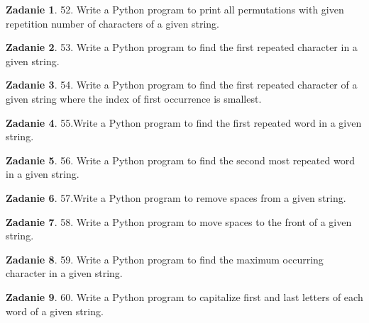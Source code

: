 \documentclass[11pt]{article}
\theoremstyle{definition}
\newtheorem{zadanie}{Zadanie}
\begin{document}
\begin{zadanie}


52. Write a Python program to print all permutations with given repetition number of characters of a given string. 

\end{zadanie}

\begin{zadanie}


53. Write a Python program to find the first repeated character in a given string. 

\end{zadanie}

\begin{zadanie}


54. Write a Python program to find the first repeated character of a given string where the index of first occurrence is smallest. 

\end{zadanie}

\begin{zadanie}


55.Write a Python program to find the first repeated word in a given string. 

\end{zadanie}

\begin{zadanie}


56. Write a Python program to find the second most repeated word in a given string. 

\end{zadanie}

\begin{zadanie}


57.Write a Python program to remove spaces from a given string. 

\end{zadanie}

\begin{zadanie}


58. Write a Python program to move spaces to the front of a given string. 

\end{zadanie}

\begin{zadanie}


59. Write a Python program to find the maximum occurring character in a given string. 

\end{zadanie}

\begin{zadanie}


60. Write a Python program to capitalize first and last letters of each word of a given string. 

\end{zadanie}
\end{document}
